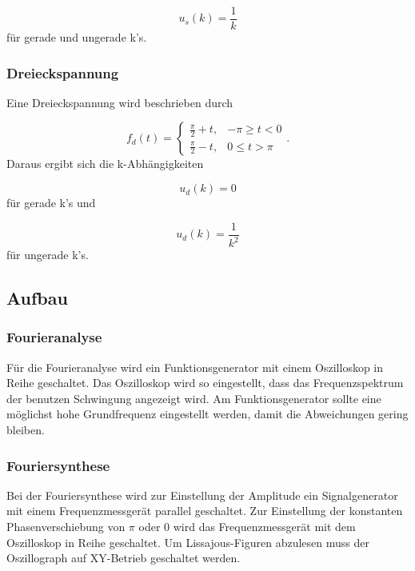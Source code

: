 \begin{equation}
  u_s(k) = \frac{1}{k}
\end{equation}
für gerade und ungerade k's.

\subsubsection{Dreieckspannung}

Eine Dreieckspannung wird beschrieben durch

\begin{equation}
  f_d(t) =
  \begin{cases}
    \frac{\pi}{2} + t, & -\pi \geq t < 0 \\
    \frac{\pi}{2} - t, & 0 \leq t > \pi
  \end{cases}.
\end{equation}
Daraus ergibt sich die k-Abhängigkeiten

\begin{equation}
  u_d(k) = 0
\end{equation}
für gerade k's und

\begin{equation}
  u_d(k) = \frac{1}{k^2}
\end{equation}
für ungerade k's.

\subsection{Aufbau}

\subsubsection{Fourieranalyse}
\label{sec:AufbauA}

Für die Fourieranalyse wird ein Funktionsgenerator mit einem Oszilloskop
in Reihe geschaltet. Das Oszilloskop wird so eingestellt, dass das
Frequenzspektrum der benutzen Schwingung angezeigt wird.
Am Funktionsgenerator sollte eine möglichst hohe Grundfrequenz eingestellt
werden, damit die Abweichungen gering bleiben.

\subsubsection{Fouriersynthese}
\label{sec:AufbauS}

Bei der Fouriersynthese wird zur Einstellung der Amplitude ein
Signalgenerator mit einem Frequenzmessgerät parallel geschaltet. Zur Einstellung
der konstanten Phasenverschiebung von $\pi$ oder 0 wird das Frequenzmessgerät
mit dem Oszilloskop in Reihe geschaltet.
Um Lissajous-Figuren abzulesen muss der Oszillograph auf XY-Betrieb geschaltet
werden.


